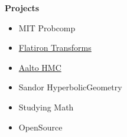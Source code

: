 \noindent \textbf{\Huge Projects}\\[0.3cm]

\begin{itemize}
    \item MIT Probcomp
    \item \hyperref[sec:transforms]{Flatiron Transforms}
    \item \hyperref[sec:aalto-hmc]{Aalto HMC}
    \item Sandor HyperbolicGeometry
    \item Studying Math
    \item OpenSource
\end{itemize}